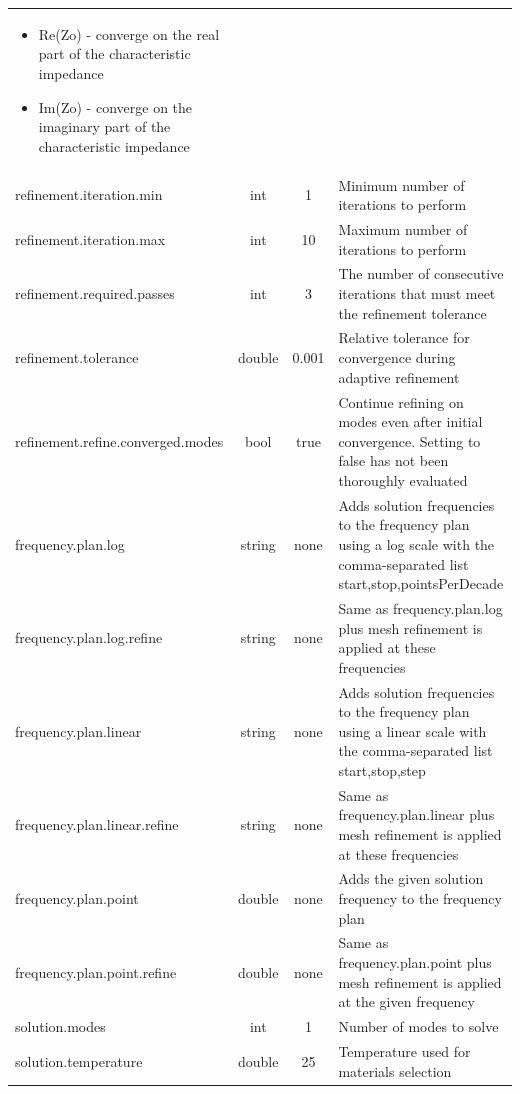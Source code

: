 \documentclass[titlepage]{article}
\renewcommand\_{\textunderscore\linebreak[1]}
\begin{document}
\begin{longtable}[c]{|lccp{8cm}|}
\begin{itemize}[nosep]
                                                     \item Re(Zo)  - converge on the real part of the characteristic impedance
                                                     \item Im(Zo)  - converge on the imaginary part of the characteristic impedance
                                                   \end{itemize}\\
    refinement.iteration.min      & int    & 1      &  Minimum number of iterations to perform \\
    refinement.iteration.max      & int    & 10     &  Maximum number of iterations to perform \\
    refinement.required.passes    & int    & 3      &  The number of consecutive iterations that must meet the refinement tolerance \\
    refinement.tolerance          & double & 0.001  & Relative tolerance for convergence during adaptive refinement \\
    refinement.refine.converged.modes & bool & true & Continue refining on modes even after initial convergence.  Setting to false has not been thoroughly evaluated \\
    frequency.plan.log            & string & none   & Adds solution frequencies to the frequency plan using a log scale with the comma-separated list start,stop,pointsPerDecade \\
    frequency.plan.log.refine     & string & none   & Same as frequency.plan.log plus mesh refinement is applied at these frequencies \\
    frequency.plan.linear         & string & none   & Adds solution frequencies to the frequency plan using a linear scale with the comma-separated list start,stop,step \\
    frequency.plan.linear.refine  & string & none   & Same as frequency.plan.linear plus mesh refinement is applied at these frequencies \\
    frequency.plan.point          & double & none   & Adds the given solution frequency to the frequency plan \\
    frequency.plan.point.refine   & double & none   & Same as frequency.plan.point plus mesh refinement is applied at the given frequency \\
    solution.modes                & int    & 1      & Number of modes to solve \\
    solution.temperature          & double & 25     & Temperature used for materials selection \\

\end{longtable}
\end{document}
